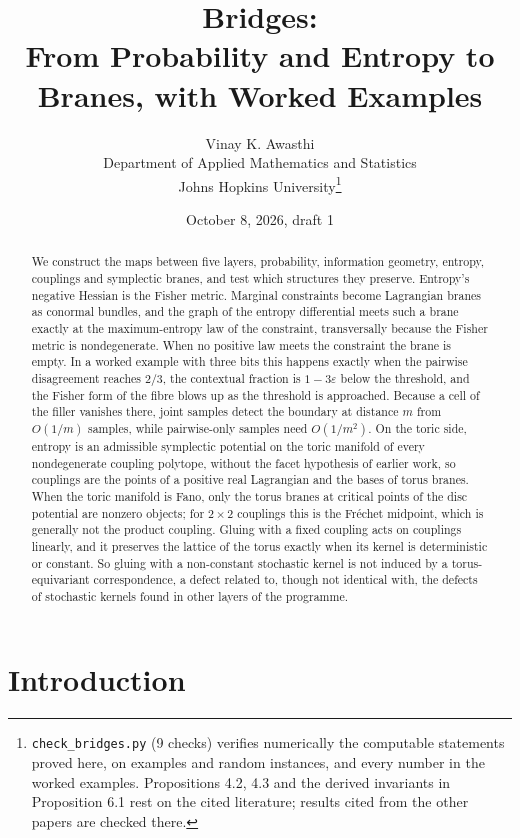 \documentclass[11pt]{article}
\title{Bridges:\\ From Probability and Entropy to Branes, with Worked Examples}
\author{Vinay K. Awasthi\\
Department of Applied Mathematics and Statistics\\
Johns Hopkins University\thanks{\texttt{check\_bridges.py} (9 checks) verifies numerically the computable statements proved here, on examples
and random instances, and every number in the worked examples. Propositions 4.2, 4.3 and the derived invariants in
Proposition 6.1 rest on the cited literature; results cited from the other papers are checked there.}}
\date{October 8, 2026, draft 1}
\theoremstyle{definition}
\theoremstyle{remark}
\begin{document}
\maketitle

\begin{abstract}
We construct the maps between five layers, probability, information geometry, entropy, couplings and symplectic branes,
and test which structures they preserve. Entropy's negative Hessian is the Fisher metric. Marginal constraints become
Lagrangian branes as conormal bundles, and the graph of the entropy differential meets such a brane exactly at the
maximum-entropy law of the constraint, transversally because the Fisher metric is nondegenerate. When no positive law meets
the constraint the brane is empty. In a worked example with three bits this happens exactly when the pairwise disagreement
reaches $2/3$, the contextual fraction is $1-3\varepsilon$ below the threshold, and the Fisher form of the fibre blows up as
the threshold is approached. Because a cell of the filler vanishes there, joint samples detect the boundary at distance $m$
from $O(1/m)$ samples, while pairwise-only samples need $O(1/m^2)$. On the toric side,
entropy is an admissible symplectic potential on the toric manifold of every nondegenerate coupling polytope, without the
facet hypothesis of earlier work, so couplings are the points of a positive real Lagrangian and the bases of torus branes. When the
toric manifold is Fano, only the torus branes at critical points of the disc potential are nonzero objects; for $2\times2$
couplings this is the Fréchet midpoint, which is generally not the product coupling. Gluing with a fixed coupling acts on couplings linearly, and it preserves the lattice of the
torus exactly when its kernel is deterministic or constant. So gluing with a non-constant stochastic kernel is not induced by a
torus-equivariant correspondence, a defect related to, though not identical with, the defects of stochastic kernels found in
other layers of the programme.
\end{abstract}

\tableofcontents

\section{Introduction}\label{sec:intro}
\end{document}

